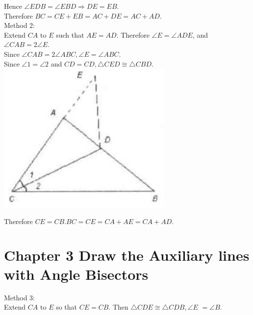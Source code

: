 \documentclass[10pt]{article}
\begin{document}
Hence \(\angle E D B=\angle E B D \Rightarrow D E=E B\).\\
Therefore \(B C=C E+E B=A C+D E=A C+A D\).\\
Method 2:\\
Extend \(C A\) to \(E\) such that \(A E=A D\). Therefore \(\angle E=\angle A D E\), and \(\angle C A B=2 \angle E\).\\
Since \(\angle C A B=2 \angle A B C, \angle E=\angle A B C\).\\
Since \(\angle 1=\angle 2\) and \(C D=C D, \triangle C E D \cong \triangle C B D\).\\
\includegraphics[max width=\textwidth, center]{2025_04_17_97bc1f7e44d93c271a88g-056(2)}

Therefore \(C E=C B . B C=C E=C A+A E=C A+A D\).

\section*{Chapter 3 Draw the Auxiliary lines with Angle Bisectors}
Method 3:\\
Extend \(C A\) to \(E\) so that \(C E=C B\). Then \(\triangle C D E \cong \triangle C D B, \angle E\) \(=\angle B\).
\end{document}
